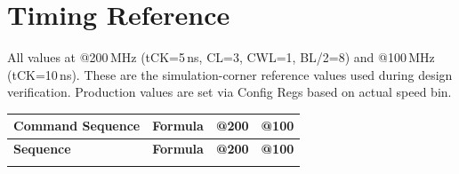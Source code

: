 \documentclass[11pt,a4paper]{article}
\begin{document}
\section{Timing Reference}

All values at @200\,MHz (tCK=5\,ns, CL=3, CWL=1, BL/2=8) and @100\,MHz (tCK=10\,ns).
These are the simulation-corner reference values used during design verification.
Production values are set via Config Regs based on actual speed bin.

\begin{longtable}{L{4.5cm} L{5.8cm} C{1.8cm} C{1.8cm}}
\toprule
\textbf{Command Sequence} & \textbf{Formula} & \textbf{@200} & \textbf{@100} \\
\midrule
\endfirsthead\toprule\textbf{Sequence}&\textbf{Formula}&\textbf{@200}&\textbf{@100}\\\midrule\endhead
\bottomrule\endfoot


\end{longtable}
\end{document}
